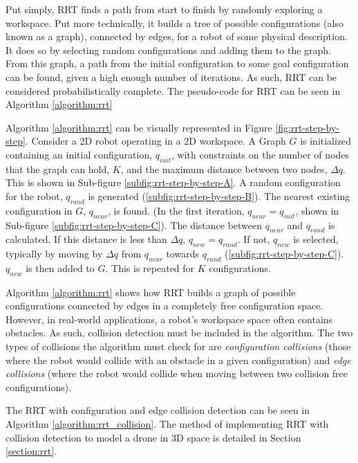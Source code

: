         Put simply, \gls{RRT} finds a path from start to finish by randomly exploring a workspace.
        Put more technically, it builds a tree of possible \glspl{configuration} (also known as a graph), connected by edges, for a robot of some physical description. It does so by selecting random \glspl{configuration} and adding them to the graph. 
        From this graph, a path from the initial \gls{configuration} to some goal \gls{configuration} can be found, given a high enough number of iterations. As such, \gls{RRT} can be considered \gls{probabilistically complete}.
        The pseudo-code for \gls{RRT} can be seen in Algorithm \ref{algorithm:rrt}
        
        

        Algorithm \ref{algorithm:rrt} can be visually represented in Figure \ref{fig:rrt-step-by-step}. Consider a \gls{2D} robot operating in a \gls{2D} workspace. A Graph $G$ is initialized containing an initial \gls{configuration}, $q_{init}$, with constraints on the number of nodes that the graph can hold, $K$, and the maximum distance between two nodes, $\Delta q$. This is shown in Sub-figure \ref{subfig:rrt-step-by-step-A}. A random \gls{configuration} for the robot, $q_{rand}$ is generated (\ref{subfig:rrt-step-by-step-B}). The nearest existing \gls{configuration} in $G$, $q_{near}$, is found. (In the first iteration, $q_{near} = q_{init}$, shown in Sub-figure \ref{subfig:rrt-step-by-step-C}). The distance between $q_{near}$ and $q_{rand}$ is calculated. If this distance is less than $\Delta q$, $q_{new} = q_{rand}$. If not, $q_{new}$ is selected, typically by moving by $\Delta q$ from $q_{near}$ towards $q_{rand}$ (\ref{subfig:rrt-step-by-step-C}). $q_{new}$ is then added to $G$. This is repeated for $K$ \gls{configuration}s.

        


        Algorithm \ref{algorithm:rrt} shows how \gls{RRT} builds a graph of possible \gls{configuration}s connected by edges in a completely free \gls{configuration} space. However, in real-world applications, a robot's \gls{workspace} space often contains obstacles. As such, collision detection must be included in the algorithm. The two types of collisions the algorithm must check for are \textit{configuration collisions} (those where the robot would collide with an obstacle in a given \gls{configuration}) and \textit{edge collisions} (where the robot would collide when moving between two collision free \gls{configuration}s).

        The RRT with \gls{configuration} and edge collision detection can be seen in Algorithm \ref{algorithm:rrt_collision}. The method of implementing \gls{RRT} with collision detection to model a drone in 3D space is detailed in Section \ref{section:rrt}.

        
